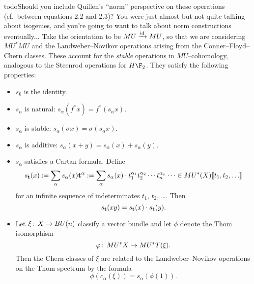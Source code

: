 \begin{definition}
todo{Should you include Quillen's ``norm'' perspective on these operations (cf.\ between equations 2.2 and 2.3)? You were just almost-but-not-quite talking about isogenies, and you're going to want to talk about norm constructions eventually...}
Take the orientation to be $MU \xrightarrow{\mathrm{id}} MU$, so that we are considering $MU^* MU$ and the Landweber--Novikov operations arising from the Conner--Floyd--Chern classes.  These account for the \emph{stable} operations in $MU$--cohomology, analogous to the Steenrod operations for $H\F_2$.  They satisfy the following properties:
\begin{itemize}
\item $s_0$ is the identity.
\item $s_\alpha$ is natural: $s_\alpha(f^* x) = f^*(s_\alpha x)$.
\item $s_\alpha$ is stable: $s_\alpha(\sigma x) = \sigma(s_\alpha x)$.
\item $s_\alpha$ is additive: $s_\alpha(x + y) = s_\alpha(x) + s_\alpha(y)$.
\item $s_\alpha$ satisfies a Cartan formula.  Define \[s_{\mathbf t}(x) := \sum_{\alpha} s_\alpha(x) \mathbf t^\alpha := \sum_\alpha s_\alpha(x) \cdot t_1^{\alpha_1} t_2^{\alpha_2} \cdots t_n^{\alpha_n} \cdots \in MU^*(X)\llbracket{t_1, t_2, \ldots}\rrbracket\] for an infinite sequence of indeterminates $t_1$, $t_2$, \ldots.  Then \[s_{\mathbf t}(x y) = s_{\mathbf t}(x) \cdot s_{\mathbf t}(y).\]
\item Let $\xi\colon\thinspace X \to BU(n)$ classify a vector bundle and let $\phi$ denote the Thom isomorphism \[\varphi\colon\thinspace MU^* X \to MU^* T(\xi).\]  Then the Chern classes of $\xi$ are related to the Landweber--Novikov operations on the Thom spectrum by the formula \[\phi(c_\alpha(\xi)) = s_\alpha(\phi(1)).\]
\end{itemize}
\end{definition}

